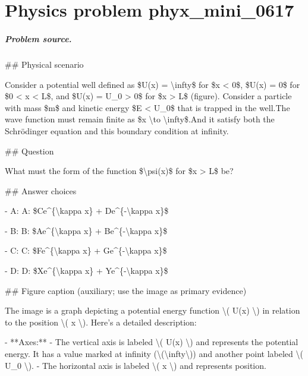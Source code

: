 
\chapter{Physics problem phyx\_mini\_0617}
\label{ch:PhyXMiniProblems_problem_phyx_mini_0617}

\paragraph{Problem source.}
\#\# Physical scenario

Consider a potential well defined as  \$U(x) = \textbackslash{}infty\$ for \$x < 0\$, \$U(x) = 0\$ for \$0 < x < L\$, and \$U(x) = U\_0 > 0\$ for \$x > L\$ (figure). Consider a particle with mass \$m\$ and kinetic energy \$E < U\_0\$ that is trapped in the well.The wave function must remain finite as \$x \textbackslash{}to \textbackslash{}infty\$.And it satisfy both the Schrödinger equation and this boundary condition at infinity.

\#\# Question

What must the form of the function \$\textbackslash{}psi(x)\$ for \$x > L\$ be?

\#\# Answer choices

- A: A: \$Ce\textasciicircum{}\{\textbackslash{}kappa x\} + De\textasciicircum{}\{-\textbackslash{}kappa x\}\$

- B: B: \$Ae\textasciicircum{}\{\textbackslash{}kappa x\} + Be\textasciicircum{}\{-\textbackslash{}kappa x\}\$

- C: C: \$Fe\textasciicircum{}\{\textbackslash{}kappa x\} + Ge\textasciicircum{}\{-\textbackslash{}kappa x\}\$

- D: D: \$Xe\textasciicircum{}\{\textbackslash{}kappa x\} + Ye\textasciicircum{}\{-\textbackslash{}kappa x\}\$

\#\# Figure caption (auxiliary; use the image as primary evidence)

The image is a graph depicting a potential energy function \textbackslash{}( U(x) \textbackslash{}) in relation to the position \textbackslash{}( x \textbackslash{}). Here's a detailed description:

- **Axes:**
  - The vertical axis is labeled \textbackslash{}( U(x) \textbackslash{}) and represents the potential energy. It has a value marked at infinity (\textbackslash{}(\textbackslash{}infty\textbackslash{})) and another point labeled \textbackslash{}( U\_0 \textbackslash{}).
  - The horizontal axis is labeled \textbackslash{}( x \textbackslash{}) and represents position.

